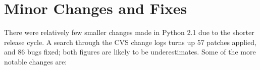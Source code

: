 \documentclass{howto}
\begin{document}
\begin{seealso}


\end{seealso}

\section{Minor Changes and Fixes}

There were relatively few smaller changes made in Python 2.1 due to
the shorter release cycle.  A search through the CVS change logs turns
up 57 patches applied, and 86 bugs fixed; both figures are likely to
be underestimates.  Some of the more notable changes are:
\end{document}
